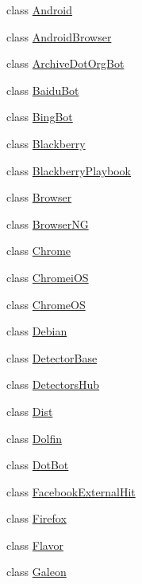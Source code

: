 \begin{DoxyCompactItemize}
\item 
class \hyperlink{classhttpagentparser_1_1_android}{Android}
\item 
class \hyperlink{classhttpagentparser_1_1_android_browser}{Android\+Browser}
\item 
class \hyperlink{classhttpagentparser_1_1_archive_dot_org_bot}{Archive\+Dot\+Org\+Bot}
\item 
class \hyperlink{classhttpagentparser_1_1_baidu_bot}{Baidu\+Bot}
\item 
class \hyperlink{classhttpagentparser_1_1_bing_bot}{Bing\+Bot}
\item 
class \hyperlink{classhttpagentparser_1_1_blackberry}{Blackberry}
\item 
class \hyperlink{classhttpagentparser_1_1_blackberry_playbook}{Blackberry\+Playbook}
\item 
class \hyperlink{classhttpagentparser_1_1_browser}{Browser}
\item 
class \hyperlink{classhttpagentparser_1_1_browser_n_g}{Browser\+NG}
\item 
class \hyperlink{classhttpagentparser_1_1_chrome}{Chrome}
\item 
class \hyperlink{classhttpagentparser_1_1_chromei_o_s}{Chromei\+OS}
\item 
class \hyperlink{classhttpagentparser_1_1_chrome_o_s}{Chrome\+OS}
\item 
class \hyperlink{classhttpagentparser_1_1_debian}{Debian}
\item 
class \hyperlink{classhttpagentparser_1_1_detector_base}{Detector\+Base}
\item 
class \hyperlink{classhttpagentparser_1_1_detectors_hub}{Detectors\+Hub}
\item 
class \hyperlink{classhttpagentparser_1_1_dist}{Dist}
\item 
class \hyperlink{classhttpagentparser_1_1_dolfin}{Dolfin}
\item 
class \hyperlink{classhttpagentparser_1_1_dot_bot}{Dot\+Bot}
\item 
class \hyperlink{classhttpagentparser_1_1_facebook_external_hit}{Facebook\+External\+Hit}
\item 
class \hyperlink{classhttpagentparser_1_1_firefox}{Firefox}
\item 
class \hyperlink{classhttpagentparser_1_1_flavor}{Flavor}
\item 
class \hyperlink{classhttpagentparser_1_1_galeon}{Galeon}
\item 

\end{DoxyCompactItemize}
